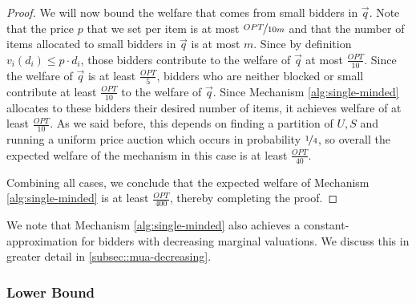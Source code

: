\begin{proof}
We will now bound the welfare that comes from small bidders in $\vec q$. Note that the price $p$ that we set per item is at most $\nicefrac{OPT}{10m}$ and that the number of items allocated to small bidders in $\vec q$ is at most $m$. Since by definition $v_i(d_i)\le p\cdot d_i$, those bidders contribute to the welfare of $\vec q$ at most
$\frac{OPT}{10}$. 
Since the welfare of $\vec{q}$ is at least $\frac{OPT}{5}$,  bidders who are neither blocked or small contribute at least $\frac{OPT}{10}$ to the welfare of $\vec q$. Since 
Mechanism \ref{alg:single-minded} allocates to these bidders their desired  number of items, it achieves welfare of at least $\frac{OPT}{10}$. 
As we said before, this 
depends on finding a  partition of $U,S$ and running a uniform price auction which occurs in probability $\nicefrac{1}{4}$, 
so overall the expected welfare of the mechanism in this case is at least $\frac{OPT}{40}$. 

Combining all cases, we conclude that the expected welfare of Mechanism \ref{alg:single-minded} is at least $\frac{OPT}{400}$, thereby completing the proof.
\end{proof}
We note that
Mechanism \ref{alg:single-minded} also achieves a constant-approximation for bidders with 
{decreasing marginal valuations}. We discuss this in greater detail in \cref{subsec::mua-decreasing}.



\subsubsection{Lower Bound}\label{subsec-lbs-22-sm-mua}


